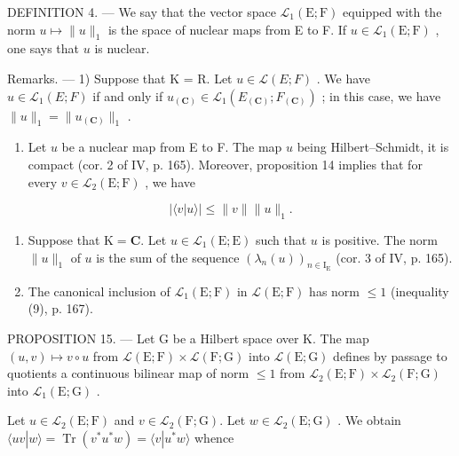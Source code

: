 DEFINITION 4. --- We say that the vector space \(\mathcal{L}_{1}(\mathrm{E};\mathrm{F})\) equipped with the norm \(u\mapsto \| u\|_{1}\) is the space of nuclear maps from E to F. If \(u\in \mathcal{L}_1(\mathrm{E};\mathrm{F})\) , one says that \(u\) is nuclear.

Remarks. --- 1) Suppose that K = R. Let \(u \in \mathcal{L}(E; F)\) . We have \(u \in \mathcal{L}_{1}(E; F)\) if and only if \(u_{(\mathbf{C})} \in \mathcal{L}_{1}(E_{(\mathbf{C})}; F_{(\mathbf{C})})\) ; in this case, we have \(\|u\|_{1} = \|u_{(\mathbf{C})}\|_{1}\) .

\begin{enumerate}
\def\labelenumi{\arabic{enumi})}
\setcounter{enumi}{1}
\tightlist
\item
  Let \(u\) be a nuclear map from E to F. The map \(u\) being Hilbert--Schmidt, it is compact (cor. 2 of IV, p. 165). Moreover, proposition 14 implies that for every \(v \in \mathcal{L}_2(\mathrm{E};\mathrm{F})\) , we have
\end{enumerate}

\[
| \langle v | u \rangle | \leqslant \| v \| \| u \| _ {1}.\tag{11}
\]

\begin{enumerate}
\def\labelenumi{\arabic{enumi})}
\setcounter{enumi}{2}
\item
  Suppose that \(\mathrm{K} = \mathbf{C}\). Let \(u \in \mathcal{L}_1(\mathrm{E};\mathrm{E})\) such that \(u\) is positive. The norm \(\| u\| _1\) of \(u\) is the sum of the sequence \((\lambda_n(u))_{n\in \mathrm{I_E}}\) (cor. 3 of IV, p. 165).
\item
  The canonical inclusion of \(\mathcal{L}_1(\mathrm{E};\mathrm{F})\) in \(\mathcal{L}(\mathrm{E};\mathrm{F})\) has norm \(\leqslant 1\) (inequality (9), p. 167).
\end{enumerate}

PROPOSITION 15. --- Let G be a Hilbert space over K. The map \((u,v)\mapsto v\circ u\) from \(\mathcal{L}(\mathrm{E};\mathrm{F})\times\mathcal{L}(\mathrm{F};\mathrm{G})\) into \(\mathcal{L}(\mathrm{E};\mathrm{G})\) defines by passage to quotients a continuous bilinear map of norm \(\leqslant1\) from \(\mathcal{L}_{2}(\mathrm{E};\mathrm{F})\times\mathcal{L}_{2}(\mathrm{F};\mathrm{G})\) into \(\mathcal{L}_{1}(\mathrm{E};\mathrm{G})\) .

Let \(u \in \mathcal{L}_2(\mathrm{E};\mathrm{F})\) and \(v \in \mathcal{L}_2(\mathrm{F};\mathrm{G})\). Let \(w \in \mathcal{L}_2(\mathrm{E};\mathrm{G})\) . We obtain \(\langle uv | w \rangle = \operatorname{Tr}(v^* u^* w) = \langle v | u^* w \rangle\) whence

